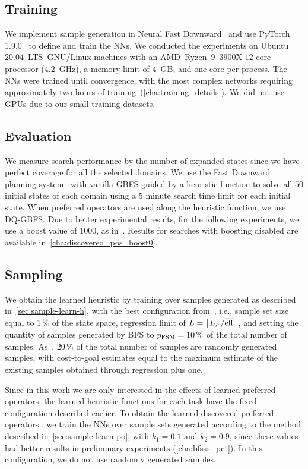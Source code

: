 \documentclass[ppgc,diss,english]{iiufrgs}
\providecommand{\ceil}[1]{\ensuremath{\left\lceil #1\right\rceil}}
\begin{document}
\subsection{Training}
\label{sec:exp-training}
We implement sample generation in Neural Fast Downward~\cite{Ferber.etal/2020a} and use PyTorch 1.9.0~\cite{Paszke/2019} to define and train the NNs. We conducted the experiments on Ubuntu~$20.04$~LTS~GNU/Linux machines with an AMD~Ryzen~$9$~$3900$X $12$-core processor ($4.2$~GHz), a memory limit of $4$~GB, and one core per process. The NNs were trained until convergence, with the most complex networks requiring approximately two hours of training~(\vref{cha:training_details}). We did not use GPUs due to our small training datasets.

\subsection{Evaluation}
\label{sec:exp-evaluation}
We measure search performance by the number of expanded states since we have perfect coverage for all the selected domains. We use the Fast Downward planning system~\cite{Helmert/2006} with vanilla GBFS guided by a heuristic function to solve all $50$ initial states of each domain using a $5$ minute search time limit for each initial state.
When preferred operators are used along the heuristic function, we use DQ-GBFS. Due to better experimental results, for the following experiments, we use a boost value of $1000$, as in~\citet{Richter.Helmert/2009}. Results for searches with boosting disabled are available in~\vref{cha:discovered_pos_boost0}.

\subsection{Sampling}
\label{sec:exp-sampling}
We obtain the learned heuristic \hnn by training over samples generated as described in~\cref{sec:sample-learn-h}, with the best configuration from~\citet{Bettker.etal/2022}, i.e., sample set size equal to $1\,\%$ of the state space, regression limit of $L=\ceil{\facts/\overline{\eff}}$, and setting the quantity of samples generated by BFS to $p_{\text{FSM}}=10\,\%$ of the total number of samples. As~\citet{Bettker.etal/2022}, $20\,\%$ of the total number of samples are randomly generated samples, with cost-to-goal estimates equal to the maximum estimate of the existing samples obtained through regression plus one.

Since in this work we are only interested in the effects of learned preferred operators, the learned heuristic functions \hnn for each task have the fixed configuration described earlier. To obtain the learned discovered preferred operators \pog, we train the NNs over sample sets generated according to the method described in~\cref{sec:sample-learn-po}, with $k_1 = 0.1$ and $k_2 = 0.9$, since these values had better results in preliminary experiments (\vref{cha:bfsss_pct}). In this configuration, we do not use randomly generated samples.
\end{document}

